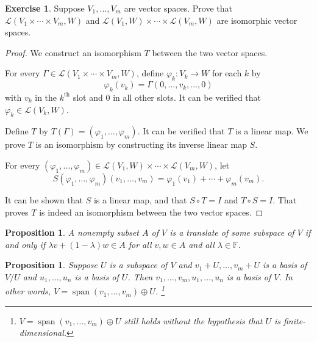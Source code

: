 \documentclass[nofonts,colorlinks]{tufte-handout}
\theoremstyle{plain} %
\newtheorem{prop}[thm]{Proposition}
\theoremstyle{definition}
\newtheorem{exer}[thm]{Exercise}
\theoremstyle{remark}
\newcommand{\bra}[1]{\mathopen{}\left(#1\right)}
\renewcommand{\phi}{\varphi}
\newcommand{\F}{\mathbb{F}}
\renewcommand{\L}{\mathcal{L}}
\DeclareMathOperator{\spn}{span}
\begin{document}
\begin{exer}
	Suppose $V_1,\dots,V_m$ are vector spaces. Prove that $\L\bra{V_1\times\cdots\times V_m,W}$ and $\L\bra{V_1,W}\times\cdots\times\L\bra{V_m,W}$ are isomorphic vector spaces. 
\end{exer}
\begin{proof}
	We construct an isomorphism $T$ between the two vector spaces.
	
	For every $\Gamma\in\L\bra{V_1\times\cdots\times V_m,W}$, define $\phi_k:V_k\to W$ for each $k$ by
	\[\phi_k\bra{v_k}=\Gamma\bra{0,\dots,v_k,\dots,0}\]
	with $v_k$ in the $k^\text{th}$ slot and $0$ in all other slots. It can be verified that $\phi_k\in\L\bra{V_k,W}$.

	Define $T$ by $T\bra{\Gamma}=\bra{\phi_1,\dots,\phi_m}$. It can be verified that $T$ is a linear map. We prove $T$ is an isomorphism by constructing its inverse linear map $S$.

	For every $\bra{\phi_1,\dots,\phi_m}\in\L\bra{V_1,W}\times\cdots\times\L\bra{V_m,W}$, let
	\[S\bra{\phi_1,\dots,\phi_m}\bra{v_1,\dots,v_m}=\phi_1\bra{v_1}+\cdots+\phi_m\bra{v_m}.\]
	
	It can be shown that $S$ is a linear map, and that $S\circ T=I$ and $T\circ S=I$. That proves $T$ is indeed an isomorphism between the two vector spaces.
\end{proof}

\begin{prop}\label{prop: test for translate}
	A nonempty subset $A$ of $V$ is a translate of some subspace of $V$ if and only if $\lambda v+\bra{1-\lambda}w\in A$ for all $v,w\in A$ and all $\lambda\in\F$.
\end{prop}


\begin{prop}\label{prop: direct sum from quotient space}
	Suppose $U$ is a subspace of $V$ and $v_1+U,\dots,v_m+U$ is a basis of $V/U$ and $u_1,\dots,u_n$ is a basis of $U$. Then $v_1,\dots,v_m,u_1,\dots,u_n$ is a basis of $V$. In other words, $V=\spn(v_1,\dots,v_m)\oplus U$.%
    \footnote{$V=\spn(v_1,\dots,v_m)\oplus U$ still holds without the hypothesis that $U$ is finite-dimensional.}
\end{prop}
\end{document}
